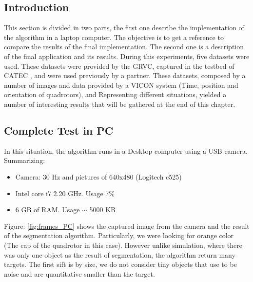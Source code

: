 \subsection{Introduction}
	This section is divided in two parts, the first one describe the implementation of the algorithm in a laptop computer. The objective is to get a reference to compare the results of the final implementation. The second one is a description of the final application and its results.
	During this experiments, five datasets were used. These datasets were provided by the GRVC, captured in the testbed of CATEC \cite{CATEC}, and were used previously by a partner. These datasets, composed by a number of images and data provided by a VICON system (Time, position and orientation of quadrotors), and Representing different situations, yielded a number of interesting results that will be gathered at the end of this chapter. 

\subsection{Complete Test in PC}
	In this situation, the algorithm runs in a Desktop computer using a USB camera. Summarizing:
	
	\begin{itemize}
		\item{Camera: 30 Hz and pictures of 640x480 (Logitech c525)}
		\item{Intel core i7 2.20 GHz. Usage 7\%}
		\item{6 GB of RAM. Usage $\sim$ 5000 KB}
	\end{itemize}
	
	Figure: \ref{fig:frames_PC} shows the captured image from the camera and the result of the segmentation algorithm. Particularly, we were looking for orange color (The cap of the quadrotor in this case). However unlike simulation, where there was only one object as the result of segmentation, the algorithm return many targets. The first sift is by size, we do not consider tiny objects that use to be noise and are quantitative smaller than the target.
	

